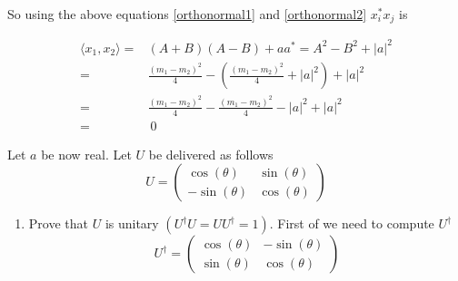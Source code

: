 \documentclass[11pt,letterpaper]{article}%
\newcommand\abs[1]{\left|#1\right|}
\newcommand\inn[2]{\langle#1,#2\rangle}
\begin{document}
\begin{enumerate}[label=\Large{\textbf{\arabic*.}}]
{\begin{enumerate}[label=\textit{\roman*.}]
{So using the above equations \eqref{orthonormal1} and \eqref{orthonormal2} $x_i^*x_j$ is

\begin{equation}
\label{orthonormal3}
\begin{split}
\inn{x_1}{x_2} =& (A + B)(A - B) + aa^* = A^2 - B^2 + \abs{a}^2\\
=& \frac{(m_1 - m_2)^2}{4} - \left(\frac{(m_1 - m_2)^2}{4} + \abs{a}^2\right) + \abs{a}^2\\
=& \frac{(m_1 - m_2)^2}{4} - \frac{(m_1 - m_2)^2}{4} - \abs{a}^2 + \abs{a}^2\\
=&\ 0
\end{split}
\end{equation}
}

\end{enumerate}

\item{
Let $a$ be now real. Let $U$ be delivered as follows
\begin{equation}
\label{U}
U =
\begin{pmatrix}
\cos(\theta) & \sin(\theta)\\
-\sin(\theta) & \cos(\theta)
\end{pmatrix}
\end{equation}

\begin{enumerate}[label=\textit{\roman*.}]
\item{
Prove that $U$ is unitary $(U^\dag U = UU^\dag = 1)$.
First of we need to compute $U^\dag$
\begin{equation}
\label{Udag}
U^\dag =
\begin{pmatrix}
\cos(\theta) & -\sin(\theta)\\
\sin(\theta) & \cos(\theta)
\end{pmatrix}
\end{equation}

}
\end{enumerate}}}
\end{enumerate}
\end{document}
